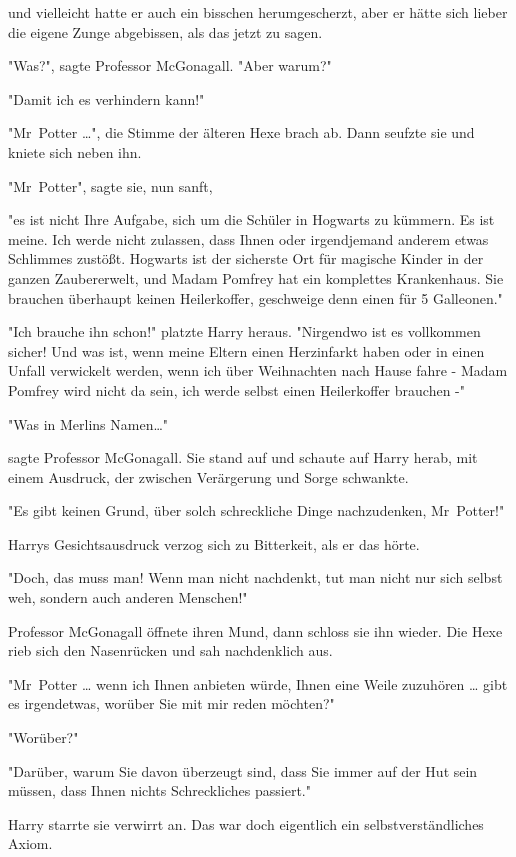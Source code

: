 {und vielleicht hatte er auch ein bisschen herumgescherzt, aber er hätte sich lieber die eigene Zunge abgebissen, als das jetzt zu sagen.

"Was?", sagte Professor McGonagall. "Aber warum?"

"Damit ich es verhindern kann!"

"Mr~Potter …", die Stimme der älteren Hexe brach ab. Dann seufzte sie und kniete sich neben ihn.

"Mr~Potter", sagte sie, nun sanft,

"es ist nicht Ihre Aufgabe, sich um die Schüler in Hogwarts zu kümmern. Es ist meine. Ich werde nicht zulassen, dass Ihnen oder irgendjemand anderem etwas Schlimmes zustößt. Hogwarts ist der sicherste Ort für magische Kinder in der ganzen Zaubererwelt, und Madam Pomfrey hat ein komplettes Krankenhaus. Sie brauchen überhaupt keinen Heilerkoffer, geschweige denn einen für 5 Galleonen."

"Ich brauche ihn schon!" platzte Harry heraus. "Nirgendwo ist es vollkommen sicher! Und was ist, wenn meine Eltern einen Herzinfarkt haben oder in einen Unfall verwickelt werden, wenn ich über Weihnachten nach Hause fahre - Madam Pomfrey wird nicht da sein, ich werde selbst einen Heilerkoffer brauchen -"

"Was in Merlins Namen…"

sagte Professor McGonagall. Sie stand auf und schaute auf Harry herab, mit einem Ausdruck, der zwischen Verärgerung und Sorge schwankte.

"Es gibt keinen Grund, über solch schreckliche Dinge nachzudenken, Mr~Potter!"

Harrys Gesichtsausdruck verzog sich zu Bitterkeit, als er das hörte.

"Doch, das muss man! Wenn man nicht nachdenkt, tut man nicht nur sich selbst weh, sondern auch anderen Menschen!"

Professor McGonagall öffnete ihren Mund, dann schloss sie ihn wieder. Die Hexe rieb sich den Nasenrücken und sah nachdenklich aus.

"Mr~Potter … wenn ich Ihnen anbieten würde, Ihnen eine Weile zuzuhören … gibt es irgendetwas, worüber Sie mit mir reden möchten?"

"Worüber?"

"Darüber, warum Sie davon überzeugt sind, dass Sie immer auf der Hut sein müssen, dass Ihnen nichts Schreckliches passiert."

Harry starrte sie verwirrt an. Das war doch eigentlich ein selbstverständliches Axiom.

}
